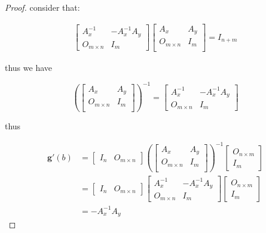 \begin{proof}
    consider that: 

    \begin{align*}
        \begin{bmatrix}
            A_x^{-1} & -A_x^{-1}A_y \\
            O_{m \times n} & I_m
        \end{bmatrix}
        \begin{bmatrix}
            A_x & A_y \\
            O_{m \times n} & I_m \\
        \end{bmatrix} = I_{n+m}
    \end{align*}  

    thus we have

    \[
\left(\begin{bmatrix}
            A_x & A_y \\
            O_{m \times n} & I_m \\
        \end{bmatrix}\right)^{-1} =         \begin{bmatrix}
            A_x^{-1} & -A_x^{-1}A_y \\
            O_{m \times n} & I_m
        \end{bmatrix}
    \]

    thus


    \begin{align*}
        \mathbf{g}'(b) &= \begin{bmatrix}
            I_n & O_{m \times n}
        \end{bmatrix}\left(\begin{bmatrix}
            A_x & A_y \\
            O_{m \times n} & I_m \\
        \end{bmatrix}\right)^{-1} \begin{bmatrix}
            O_{n \times m} \\
            I_m
        \end{bmatrix} \\
        &=\begin{bmatrix}
            I_n & O_{m \times n}
        \end{bmatrix}
        \begin{bmatrix}
            A_x^{-1} & -A_x^{-1}A_y \\
            O_{m \times n} & I_m
        \end{bmatrix}
        \begin{bmatrix}
            O_{n \times m} \\
            I_m
        \end{bmatrix} \\
        &=  - A_x^{-1}A_y
    \end{align*}
\end{proof}

